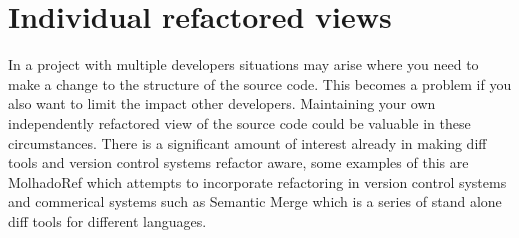 
\chapter{Individual refactored views}

In a project with multiple developers situations may arise where you need to make a change to the structure of the source code. This becomes a problem if you also want to limit the impact other developers.  Maintaining your own independently refactored view of the source code could be valuable in these circumstances. There is a significant amount of interest already in making diff tools and version control systems refactor aware, some examples of this are MolhadoRef \cite{DannyDig} \cite{Dig2008} which attempts to incorporate refactoring in version control systems and commerical systems such as Semantic Merge which is a series of stand alone diff tools for different languages. 

